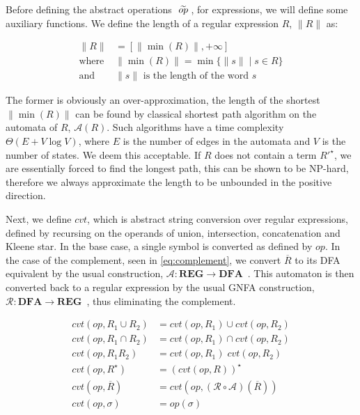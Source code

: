 Before defining the abstract operations $\;\widetilde{op}\;$, for expressions, we will define some auxiliary functions.
We define the length of a regular expression $R$, $\|R\|$ as:

\begin{align}\label{eq:r1}
    \|R\| & = [\|\min(R)\|, +\infty ] \\
    \text{where } & \|\min(R)\| = \min\{ \|s\| \mid s \in R \} \\ \label{eq:r2}
    \text{and } & \|s\| \text{ is the length of the word $s$}
\end{align}

The former is obviously an over-approximation, the length of the shortest $\|\min(R)\|$ can be found by classical shortest path algorithm on the automata of $R$, $\mathcal{A}(R)$.
Such algorithms have a time complexity $\Theta(E + V \log V)$, where $E$ is the number of edges in the automata and $V$ is the number of states.
We deem this acceptable.
If $R$ does not contain a term $R'^\star$, we are essentially forced to find the longest path, this can be shown to be NP-hard, therefore we always approximate the length to be unbounded in the positive direction.

Next, we define $cvt$, which is abstract string conversion over regular expressions, defined by recursing on the operands of union, intersection, concatenation and Kleene star.
In the base case, a single symbol is converted as defined by $op$.
In the case of the complement, seen in \autoref{eq:complement}, we convert $\overline{R}$ to its DFA equivalent by the usual construction, $\mathcal{A}:\mathbf{REG} \rightarrow \mathbf{DFA}$~\cite{sipserbook}.
This automaton is then converted back to a regular expression by the usual GNFA construction, $\mathcal{R}: \mathbf{DFA} \rightarrow \mathbf{REG}$~\cite{sipserbook}, thus eliminating the complement.

\begin{align}
    cvt(op, R_1 \cup R_2) &= cvt(op, R_1) \cup cvt(op, R_2) \\
    cvt(op, R_1 \cap R_2) &= cvt(op, R_1) \cap cvt(op, R_2) \\
    cvt(op, R_1 R_2) &= cvt(op, R_1) \; cvt(op, R_2) \\
    cvt(op, R^\star) &= (cvt(op, R))^\star \\
    cvt(op, \overline{R}) &= cvt(op, (\mathcal{R} \circ \mathcal{A}) (\overline{R})) \label{eq:complement} \\
    cvt(op, \sigma) &= op(\sigma)
\end{align}

